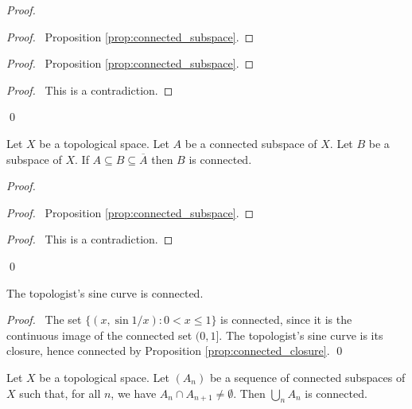 \begin{proof}
\pf
{}
\begin{proof}
	\pf\ Proposition \ref{prop:connected_subspace}.
\end{proof}
\begin{proof}
	\pf\ Proposition \ref{prop:connected_subspace}.
\end{proof}
\qedstep
\begin{proof}
	\pf\ This is a contradiction.
\end{proof}
\qed
\end{proof}

\begin{prop}
\label{prop:connected_closure}
Let $X$ be a topological space. Let $A$ be a connected subspace of $X$. Let $B$ be a subspace of $X$. If $A \subseteq B \subseteq \overline{A}$ then $B$ is connected.
\end{prop}

\begin{proof}
\pf
{}
\begin{proof}
	\pf\ Proposition \ref{prop:connected_subspace}.
\end{proof}
\qedstep
\begin{proof}
	\pf\ This is a contradiction.
\end{proof}
\qed
\end{proof}

\begin{cor}
The topologist's sine curve is connected.
\end{cor}

\begin{proof}
\pf\ The set $\{ (x, \sin 1/x) : 0 < x \leq 1 \}$ is connected, since it is the continuous image of the connected set $(0,1]$. The topologist's sine curve is its closure, hence connected by Proposition \ref{prop:connected_closure}. \qed
\end{proof}

\begin{prop}
Let $X$ be a topological space. Let $(A_n)$ be a sequence of connected subspaces of $X$ such that, for all $n$, we have $A_n \cap A_{n+1} \neq \emptyset$. Then $\bigcup_n A_n$ is connected.
\end{prop}

